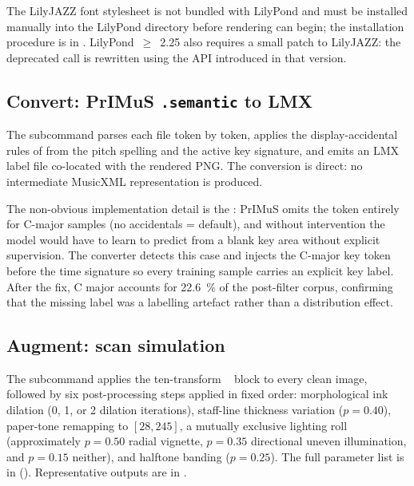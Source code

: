 The LilyJAZZ font stylesheet is not bundled with LilyPond and must be
installed manually into the LilyPond  directory before
rendering can begin; the installation procedure is in
.
LilyPond~$\geq$~2.25 also requires a small patch to LilyJAZZ: the
deprecated  call is rewritten using the
 API introduced in that version.

\subsection{Convert: PrIMuS \texttt{.semantic} to LMX}

The  subcommand parses each  file
token by token, applies the display-accidental rules of
 from the pitch spelling and the active key
signature, and emits an LMX label file co-located with the rendered
PNG.
The conversion is direct: no intermediate MusicXML representation is
produced.

The non-obvious implementation detail is the :
PrIMuS omits the  token entirely for C-major
samples (no accidentals = default), and without intervention the model
would have to learn to predict  from a blank key
area without explicit supervision.
The converter detects this case and injects the C-major key token
before the time signature so every training sample carries an
explicit key label.
After the fix, C major accounts for \SI{22.6}{\percent} of the
post-filter corpus, confirming that the missing label was a labelling
artefact rather than a distribution effect.

\subsection{Augment: scan simulation}

The  subcommand applies the ten-transform
~\cite{AlbumentationsFastFlexible} block to every
clean image, followed by six post-processing steps applied in fixed
order: morphological ink dilation (0, 1, or 2 dilation iterations),
staff-line thickness variation ($p=0.40$), paper-tone remapping to
$[28, 245]$, a mutually exclusive lighting roll (approximately
$p=0.50$ radial vignette, $p=0.35$ directional uneven illumination,
and $p=0.15$ neither), and halftone banding ($p=0.25$).
The full parameter list is in  ().
Representative outputs are in .

